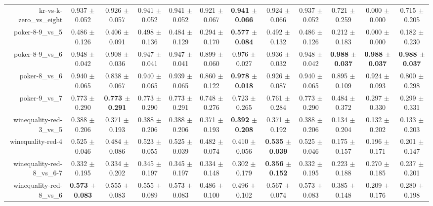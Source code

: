 \begin{table}[!ht]
{\begin{tabular}{r c c c c c c c c c c c}
kr-vs-k-zero\_vs\_eight & 0.937 $\pm$ 0.052 & 0.926 $\pm$ 0.057 & 0.941 $\pm$ 0.052 & 0.941 $\pm$ 0.052 & 0.921 $\pm$ 0.067 & \textbf{0.941 $\pm$ 0.066} & 0.924 $\pm$ 0.066 & 0.937 $\pm$ 0.052 & 0.721 $\pm$ 0.259 & 0.000 $\pm$ 0.000 & 0.715 $\pm$ 0.205 \\
poker-8-9\_vs\_5 & 0.486 $\pm$ 0.126 & 0.406 $\pm$ 0.091 & 0.498 $\pm$ 0.136 & 0.484 $\pm$ 0.129 & 0.294 $\pm$ 0.170 & \textbf{0.577 $\pm$ 0.084} & 0.492 $\pm$ 0.132 & 0.486 $\pm$ 0.126 & 0.212 $\pm$ 0.183 & 0.000 $\pm$ 0.000 & 0.182 $\pm$ 0.230 \\
poker-8-9\_vs\_6 & 0.948 $\pm$ 0.042 & 0.908 $\pm$ 0.036 & 0.947 $\pm$ 0.041 & 0.947 $\pm$ 0.041 & 0.899 $\pm$ 0.060 & 0.976 $\pm$ 0.027 & 0.936 $\pm$ 0.032 & 0.948 $\pm$ 0.042 & \textbf{0.988 $\pm$ 0.037} & \textbf{0.988 $\pm$ 0.037} & \textbf{0.988 $\pm$ 0.037} \\
poker-8\_vs\_6 & 0.940 $\pm$ 0.065 & 0.838 $\pm$ 0.067 & 0.940 $\pm$ 0.065 & 0.939 $\pm$ 0.065 & 0.860 $\pm$ 0.122 & \textbf{0.978 $\pm$ 0.018} & 0.926 $\pm$ 0.087 & 0.940 $\pm$ 0.065 & 0.895 $\pm$ 0.109 & 0.924 $\pm$ 0.093 & 0.800 $\pm$ 0.298 \\
poker-9\_vs\_7 & 0.773 $\pm$ 0.290 & \textbf{0.773 $\pm$ 0.291} & 0.773 $\pm$ 0.290 & 0.773 $\pm$ 0.291 & 0.748 $\pm$ 0.276 & 0.723 $\pm$ 0.265 & 0.761 $\pm$ 0.284 & 0.773 $\pm$ 0.290 & 0.484 $\pm$ 0.372 & 0.297 $\pm$ 0.330 & 0.299 $\pm$ 0.331 \\
winequality-red-3\_vs\_5 & 0.388 $\pm$ 0.206 & 0.371 $\pm$ 0.193 & 0.388 $\pm$ 0.206 & 0.388 $\pm$ 0.206 & 0.371 $\pm$ 0.193 & \textbf{0.392 $\pm$ 0.208} & 0.371 $\pm$ 0.192 & 0.388 $\pm$ 0.206 & 0.134 $\pm$ 0.204 & 0.132 $\pm$ 0.202 & 0.133 $\pm$ 0.203 \\
winequality-red-4 & 0.525 $\pm$ 0.046 & 0.484 $\pm$ 0.086 & 0.523 $\pm$ 0.055 & 0.525 $\pm$ 0.039 & 0.482 $\pm$ 0.074 & 0.410 $\pm$ 0.056 & \textbf{0.535 $\pm$ 0.039} & 0.525 $\pm$ 0.046 & 0.175 $\pm$ 0.157 & 0.196 $\pm$ 0.171 & 0.201 $\pm$ 0.147 \\
winequality-red-8\_vs\_6-7 & 0.332 $\pm$ 0.195 & 0.334 $\pm$ 0.202 & 0.345 $\pm$ 0.197 & 0.345 $\pm$ 0.197 & 0.334 $\pm$ 0.148 & 0.302 $\pm$ 0.179 & \textbf{0.356 $\pm$ 0.152} & 0.332 $\pm$ 0.195 & 0.223 $\pm$ 0.188 & 0.270 $\pm$ 0.185 & 0.237 $\pm$ 0.201 \\
winequality-red-8\_vs\_6 & \textbf{0.573 $\pm$ 0.083} & 0.555 $\pm$ 0.083 & 0.555 $\pm$ 0.089 & 0.573 $\pm$ 0.083 & 0.486 $\pm$ 0.100 & 0.496 $\pm$ 0.102 & 0.567 $\pm$ 0.074 & 0.573 $\pm$ 0.083 & 0.385 $\pm$ 0.148 & 0.209 $\pm$ 0.176 & 0.280 $\pm$ 0.198 \\

\end{tabular}}
\end{table}
